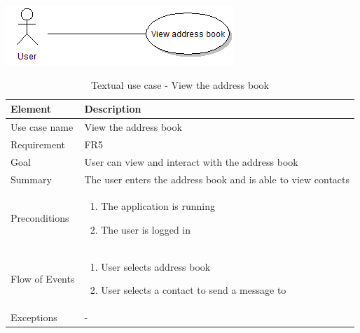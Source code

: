 \begin{table}
\begin{center}
\begin{center}
\includegraphics[width=\textwidth]{view_address_book}
\end{center}
\begin{tabular}{p{3cm}|p{12cm}} \hline
\textbf{Element} & \textbf{Description} \\ \hline \hline
Use case name & View the address book \\
Requirement & FR5 \\
Goal & User can view and interact with the address book \\
Summary &The user enters the address book and is able to view  contacts \\ \hline
Preconditions &
\begin{enumerate}
\item{}The application is running
\item{}The user is logged in
\end{enumerate} \\ \hline
Flow of Events &
\begin{enumerate}
\item{}User selects address book
\item{}User selects a contact to send a message to
\end{enumerate} \\ \hline
Exceptions & - \\ \hline
\end{tabular}
\end{center}
\caption{Textual use case - View the address book} \label{tab:viewandinteract}
\end{table}

